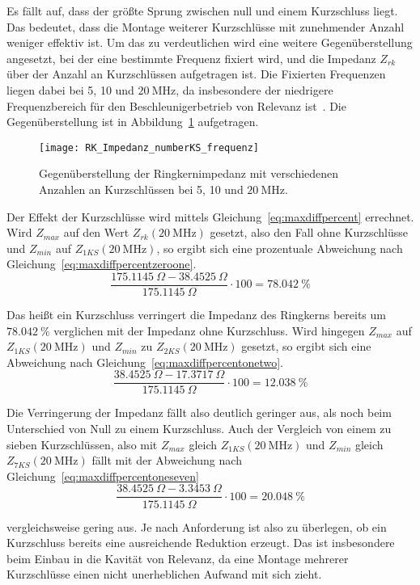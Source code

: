Es f\"allt auf, dass der gr\"o\ss{}te Sprung zwischen null und einem Kurzschluss liegt. Das bedeutet, dass die Montage weiterer Kurzschl\"usse mit zunehmender Anzahl weniger effektiv ist. Um das zu verdeutlichen wird eine weitere Gegen\"uberstellung angesetzt, bei der eine bestimmte Frequenz fixiert wird, und die Impedanz $Z_{rk}$ \"uber der Anzahl an Kurzschl\"ussen aufgetragen ist. Die Fixierten Frequenzen liegen dabei bei 5, 10 und $\SI{20}{\mega\hertz}$, da insbesondere der niedrigere Frequenzbereich f\"ur den Beschleunigerbetrieb von Relevanz ist~\citep{frey2015status}. Die Gegen\"uberstellung ist in Abbildung~\ref{fig:ringcorenumber20} aufgetragen.
\begin{figure}[htb]
	\centering
	\texttt{[image: RK\_Impedanz\_numberKS\_frequenz]}
	\caption{Gegen\"uberstellung der Ringkernimpedanz mit verschiedenen Anzahlen an Kurzschl\"ussen bei 5, 10 und $\SI{20}{\mega\hertz}$.}
	\label{fig:ringcorenumber20}
\end{figure}
\par
Der Effekt der Kurzschl\"usse wird mittels Gleichung~\ref{eq:maxdiffpercent} errechnet. Wird $Z_{max}$ auf den Wert $Z_{rk}(\SI{20}{\mega\hertz})$ gesetzt, also den Fall ohne Kurzschl\"usse und $Z_{min}$ auf $Z_{1KS}(\SI{20}{\mega\hertz})$, so ergibt sich eine prozentuale Abweichung nach Gleichung~\ref{eq:maxdiffpercentzeroone}.
\begin{equation}
	\frac{\SI{175,1145}{\Omega} - \SI{38,4525}{\Omega}}{\SI{175,1145}{\Omega}}\cdot 100 = \SI{78,042}{\%}
	\label{eq:maxdiffpercentzeroone}
\end{equation}
\par
Das hei\ss{}t ein Kurzschluss verringert die Impedanz des Ringkerns bereits um $\SI{78,042}{\%}$ verglichen mit der Impedanz ohne Kurzschluss. Wird hingegen $Z_{max}$ auf $Z_{1KS}(\SI{20}{\mega\hertz})$ und $Z_{min}$ zu $Z_{2KS}(\SI{20}{\mega\hertz})$ gesetzt, so ergibt sich eine Abweichung nach Gleichung~\ref{eq:maxdiffpercentonetwo}.
\begin{equation}
	\frac{\SI{38,4525}{\Omega} - \SI{17,3717}{\Omega}}{\SI{175,1145}{\Omega}}\cdot 100 = \SI{12,038}{\%}
	\label{eq:maxdiffpercentonetwo}
\end{equation}
\par
Die Verringerung der Impedanz f\"allt also deutlich geringer aus, als noch beim Unterschied von Null zu einem Kurzschluss. Auch der Vergleich von einem zu sieben Kurzschl\"ussen, also mit $Z_{max}$ gleich $Z_{1KS}(\SI{20}{\mega\hertz})$ und $Z_{min}$ gleich $Z_{7KS}(\SI{20}{\mega\hertz})$ f\"allt mit der Abweichung nach Gleichung~\ref{eq:maxdiffpercentoneseven}
\begin{equation}
	\frac{\SI{38,4525}{\Omega} - \SI{3,3453}{\Omega}}{\SI{175,1145}{\Omega}}\cdot 100 = \SI{20,048}{\%}
	\label{eq:maxdiffpercentoneseven}
\end{equation}
\par
vergleichsweise gering aus. Je nach Anforderung ist also zu \"uberlegen, ob ein Kurzschluss bereits eine ausreichende Reduktion erzeugt. Das ist insbesondere beim Einbau in die Kavit\"at von Relevanz, da eine Montage mehrerer Kurzschl\"usse einen nicht unerheblichen Aufwand mit sich zieht. 


